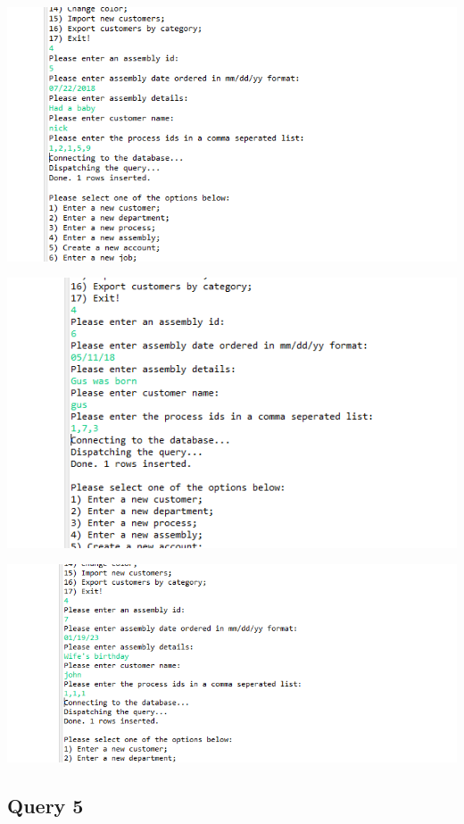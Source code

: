 \documentclass[11pt]{article}
\begin{document}
\includegraphics[width = \textwidth]{ass3.png}

\includegraphics[width = \textwidth]{ass4.png}

\includegraphics[width = \textwidth]{ass5.png}

\subsection{Query 5}
\end{document}
